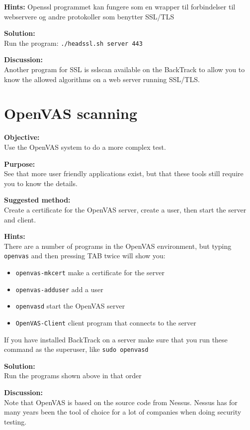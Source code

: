 \documentclass[a4paper,11pt,notitlepage]{report}
\begin{document}
{\bf Hints:}
Openssl programmet kan fungere som en wrapper til forbindelser til
webservere og andre protokoller som benytter SSL/TLS

{\bf Solution:}\\
Run the program: \verb+./headssl.sh server 443+


{\bf Discussion:} \\
Another program for SSL is sslscan available on the BackTrack to allow you to know the allowed algorithms on a web server running SSL/TLS.


\chapter{OpenVAS scanning}
\label{ex:openvas}

{\bf Objective:}\\
Use the OpenVAS system to do a more complex test.

{\bf Purpose:}\\
See that more user friendly applications exist, but that these tools still require you to know the details.

{\bf Suggested method:} \\
Create a certificate for the OpenVAS server, create a user, then start the server and client.

{\bf Hints:}\\
There are a number of programs in the OpenVAS environment, but typing \verb+openvas+ and then pressing TAB twice will show you:
\begin{itemize}
\item \verb+openvas-mkcert+ make a certificate for the server
\item \verb+openvas-adduser+ add a user
\item \verb+openvasd+ start the OpenVAS server
\item \verb+OpenVAS-Client+ client program that connects to the server
\end{itemize}

If you have installed BackTrack on a server make sure that you run these command as the superuser, like \verb+sudo openvasd+

{\bf Solution:}\\
Run the programs shown above in that order

{\bf Discussion:} \\
Note that OpenVAS is based on the source code from Nessus. Nessus has for many years been the tool of choice for a lot of companies when doing security testing.
\end{document}
